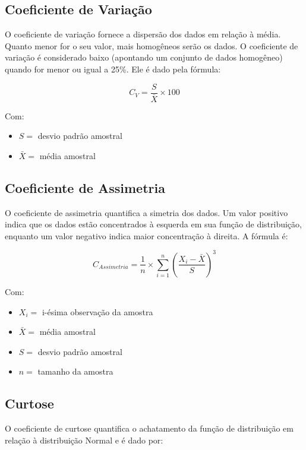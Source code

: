 \documentclass[
]{estat/estat}
\begin{document}
\subsection{Coeficiente de
Variação}\label{coeficiente-de-variauxe7uxe3o}

O coeficiente de variação fornece a dispersão dos dados em relação à
média. Quanto menor for o seu valor, mais homogêneos serão os dados. O
coeficiente de variação é considerado baixo (apontando um conjunto de
dados homogêneo) quando for menor ou igual a 25\%. Ele é dado pela
fórmula:

\[C_V=\frac{S}{\bar{X}}\times 100\]

Com:

\begin{itemize}
\item
  \(S =\) desvio padrão amostral
\item
  \(\bar{X} =\) média amostral
\end{itemize}

\subsection{Coeficiente de Assimetria}\label{coeficiente-de-assimetria}

O coeficiente de assimetria quantifica a simetria dos dados. Um valor
positivo indica que os dados estão concentrados à esquerda em sua função
de distribuição, enquanto um valor negativo indica maior concentração à
direita. A fórmula é:

\[C_{Assimetria} = \frac{1}{n}\times\sum\limits_{i=1}^{n} \left(\frac{X_i - \bar{X}}{S}\right)^3 \]

Com:

\begin{itemize}
\item
  \(X_i =\) i-ésima observação da amostra
\item
  \(\bar{X} =\) média amostral
\item
  \(S=\) desvio padrão amostral
\item
  \(n=\) tamanho da amostra
\end{itemize}

\subsection{Curtose}\label{curtose}

O coeficiente de curtose quantifica o achatamento da função de
distribuição em relação à distribuição Normal e é dado por:
\end{document}
